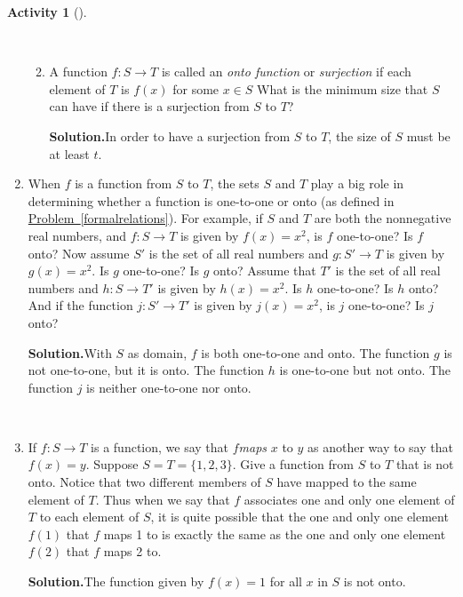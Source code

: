 \documentclass[10pt,]{book}
\theoremstyle{plain}
\theoremstyle{definition}
\newtheorem{activity}[project]{Activity}
\numberwithin{equation}{chapter}
\begin{document}
\begin{activity}[]
\begin{enumerate}[label=(\alph*)]
\begin{enumerate}[label=(\alph*)]
~\par
\item A function \(f:S\rightarrow T\) is called an \emph{onto function} or \emph{surjection} if each element of \(T\) is \(f(x)\) for some \(x\in S\) What is the minimum size that \(S\) can have if there is a  surjection from \(S\) to \(T\)?%
\par\medskip\noindent%
\textbf{Solution.}\quad In order to have a surjection from \(S\) to \(T\), the size of \(S\) must be at least \(t\).%

\end{enumerate}
\item When \(f\) is a function from \(S\) to \(T\), the sets \(S\) and \(T\) play a big role in determining whether a function is one-to-one or onto (as defined in \hyperref[formalrelations]{Problem~\ref{formalrelations}}). For example, if \(S\) and \(T\) are both the nonnegative real numbers, and \(f:S\rightarrow T\) is given by \(f(x) =x^2\), is \(f\) one-to-one? Is \(f\) onto? Now assume \(S'\) is the set of all real numbers and \(g:S'\rightarrow T\) is given by \(g(x) = x^2\). Is \(g\) one-to-one? Is \(g\) onto? Assume that \(T'\) is the set of all real numbers and \(h:S\rightarrow T'\) is given by \(h(x) = x^2\). Is \(h\) one-to-one? Is \(h\) onto? And if the function \(j:S'\rightarrow T'\) is given by \(j(x)=x^2\), is \(j\) one-to-one? Is \(j\) onto?%
\par\medskip\noindent%
\textbf{Solution.}\quad With \(S\) as domain, \(f\) is both one-to-one and onto. The function \(g\) is not one-to-one, but it is onto. The function \(h\) is one-to-one but not onto. The function \(j\) is neither one-to-one nor onto.%

~\par
\item If \(f:S\rightarrow T\) is a function, we say that \(f\)\emph{maps} \(x\) to \(y\) as another way to say that \(f(x)=y\). Suppose \(S=T=\{1,2,3\}\). Give a function from \(S\) to \(T\) that is not onto. Notice that two different members of \(S\) have mapped to the same element of \(T\). Thus when we say that \(f\) associates one and only one element of \(T\) to each element of \(S\), it is quite possible that the one and only one element \(f(1)\) that \(f\) maps 1 to is exactly the same as the one and only one element \(f(2)\) that \(f\) maps 2 to.%
\par\medskip\noindent%
\textbf{Solution.}\quad The function given by \(f(x)=1\) for all \(x\) in \(S\) is not onto.%

\end{enumerate}
\end{activity}
\typeout{************************************************}
\typeout{************************************************}
\end{document}
